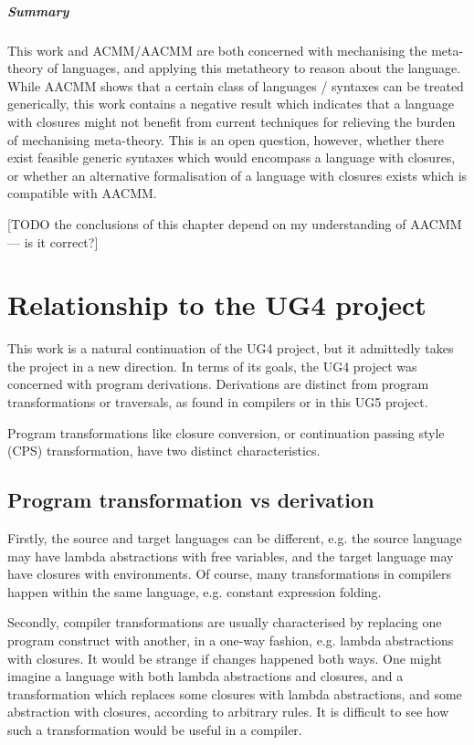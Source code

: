 \documentclass[bsc,frontabs,oneside,singlespacing,parskip,deptreport]{infthesis}
\theoremstyle{definition}
\begin{document}
\paragraph{Summary}
This work and ACMM/AACMM are both concerned with mechanising the
meta-theory of languages, and applying this metatheory to reason about
the language. While AACMM shows that a certain class of languages /
syntaxes can be treated generically, this work contains a negative
result which indicates that a language with closures might not benefit
from current techniques for relieving the burden of mechanising
meta-theory. This is an open question, however, whether there exist
feasible generic syntaxes which would encompass a language with
closures, or whether an alternative formalisation of a language with
closures exists which is compatible with AACMM.

[TODO the conclusions of this chapter depend on my understanding of
AACMM --- is it correct?]

\chapter{Relationship to the UG4 project}

This work is a natural continuation of the UG4 project, but it
admittedly takes the project in a new direction. In terms of its
goals, the UG4 project was concerned with program
derivations. Derivations are distinct from program transformations or
traversals, as found in compilers or in this UG5 project.

Program transformations like closure conversion, or continuation
passing style (CPS) transformation, have two distinct characteristics.

\section{Program transformation vs derivation}
\label{sec:progr-transf-vs}

Firstly, the source and target languages can be different, e.g. the
source language may have lambda abstractions with free variables, and
the target language may have closures with environments. Of course,
many transformations in compilers happen within the same language,
e.g. constant expression folding.

Secondly, compiler transformations are usually characterised by
replacing one program construct with another, in a one-way fashion,
e.g. lambda abstractions with closures. It would be strange if changes
happened both ways. One might imagine a language with both lambda
abstractions and closures, and a transformation which replaces some
closures with lambda abstractions, and some abstraction with closures,
according to arbitrary rules. It is difficult to see how such a
transformation would be useful in a compiler.
\end{document}
